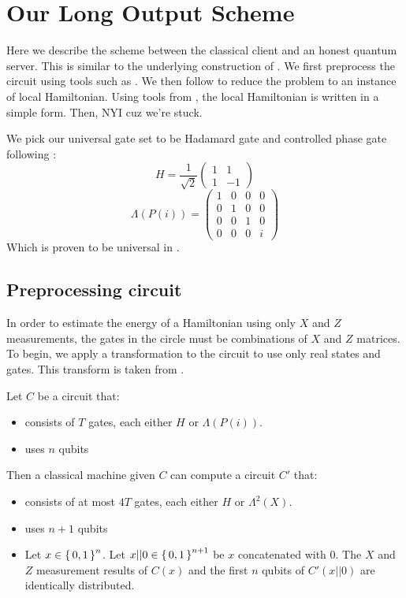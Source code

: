 \section{Our Long Output Scheme}

Here we describe the scheme between the classical client and an honest quantum server. This is similar to the underlying construction of \cite{mahadev_delegation}. We first preprocess the circuit using tools such as \cite{quant-ph/0301040}. We then follow \cite{kitaev2002classical} to reduce the problem to an instance of local Hamiltonian. Using tools from \cite{PhysRevA.93.022326}, the local Hamiltonian is written in a simple form. Then, NYI cuz we're stuck. 

We pick our universal gate set to be Hadamard gate and controlled phase gate following \cite{quant-ph/0301040}:
$$H=\frac{1}{\sqrt{2}}\begin{pmatrix}1&1\\1&-1\end{pmatrix}$$
	$$\Lambda(P(i))=\begin{pmatrix}1&0&0&0\\0&1&0&0\\0&0&1&0\\0&0&0&i\end{pmatrix}$$
		Which is proven to be universal in \cite{kitaev_1997}.

\subsection{Preprocessing circuit}

In order to estimate the energy of a Hamiltonian using only $X$ and $Z$ measurements, the gates in the circle must be combinations of $X$ and $Z$ matrices. To begin, we apply a transformation to the circuit to use only real states and gates. This transform is taken from \cite{quant-ph/0301040}.

\begin{theorem}
	Let $C$ be a circuit that:
	\begin{itemize}
		\item consists of $T$ gates, each either $H$ or $\Lambda(P(i))$.
		\item uses $n$ qubits
	\end{itemize}
	Then a classical machine given $C$ can compute a circuit $C'$ that:
	\begin{itemize}
		\item consists of at most $4T$ gates, each either $H$ or $\Lambda^2(X)$.
		\item uses $n+1$ qubits
		\item Let $x\in\set{0,1}^n$. Let $x||0\in\set{0,1}^{n+1}$ be $x$ concatenated with $0$. The $X$ and $Z$ measurement results of $C(x)$ and the first $n$ qubits of $C'(x||0)$ are identically distributed.
	\end{itemize}
\end{theorem}


